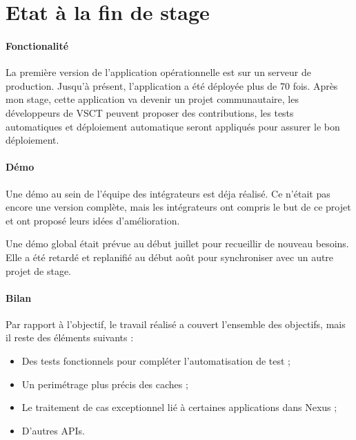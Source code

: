 \section{Etat à la fin de stage}

\paragraph{Fonctionalité}
La première version de l'application opérationnelle est sur un serveur de production.
Jusqu'à présent, l'application a été déployée plus de 70 fois.
Après mon stage, cette application va devenir un projet communautaire,
les développeurs de VSCT peuvent proposer des contributions,
les tests automatiques et déploiement automatique seront appliqués pour assurer le bon déploiement.

\paragraph{Démo}
Une démo au sein de l'équipe des intégrateurs est déja réalisé.
Ce n'était pas encore une version complète, mais les intégrateurs ont compris le but de ce projet et ont proposé leurs idées d'amélioration.

Une démo global était prévue au début juillet pour recueillir de nouveau besoins.
Elle a été retardé et replanifié au début août pour synchroniser avec un autre projet de stage.

\paragraph{Bilan}
Par rapport à l'objectif, le travail réalisé a couvert l'ensemble des objectifs, mais il reste des éléments suivants :
\begin{itemize}
  \item Des tests fonctionnels pour compléter l'automatisation de test ;
  \item Un perimétrage plus précis des caches ;
  \item Le traitement de cas exceptionnel lié à certaines applications dans Nexus ;
  \item D'autres APIs.
\end{itemize}

\clearpage
